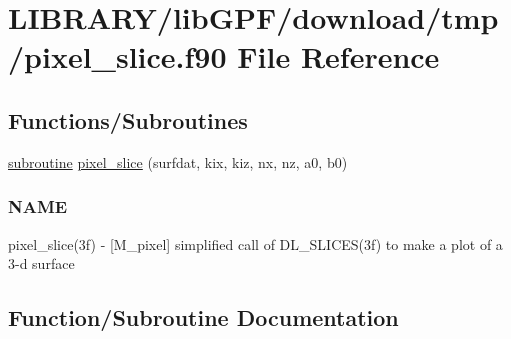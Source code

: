 \hypertarget{pixel__slice_8f90}{}\section{L\+I\+B\+R\+A\+R\+Y/lib\+G\+P\+F/download/tmp/pixel\+\_\+slice.f90 File Reference}
\label{pixel__slice_8f90}
\subsection*{Functions/\+Subroutines}
\begin{DoxyCompactItemize}
\item 
\hyperlink{M__stopwatch_83_8txt_acfbcff50169d691ff02d4a123ed70482}{subroutine} \hyperlink{pixel__slice_8f90_a8113cc3f9dd0449a8e74ef4ae1dfe829}{pixel\+\_\+slice} (surfdat, kix, kiz, nx, nz, a0, b0)
\begin{DoxyCompactList}\small\item\em \subsubsection*{N\+A\+ME}

pixel\+\_\+slice(3f) -\/ \mbox{[}M\+\_\+pixel\mbox{]} simplified call of D\+L\+\_\+\+S\+L\+I\+C\+E\+S(3f) to make a plot of a 3-\/d surface \end{DoxyCompactList}\end{DoxyCompactItemize}


\subsection{Function/\+Subroutine Documentation}
\mbox{\label{pixel__slice_8f90_a8113cc3f9dd0449a8e74ef4ae1dfe829}} 
